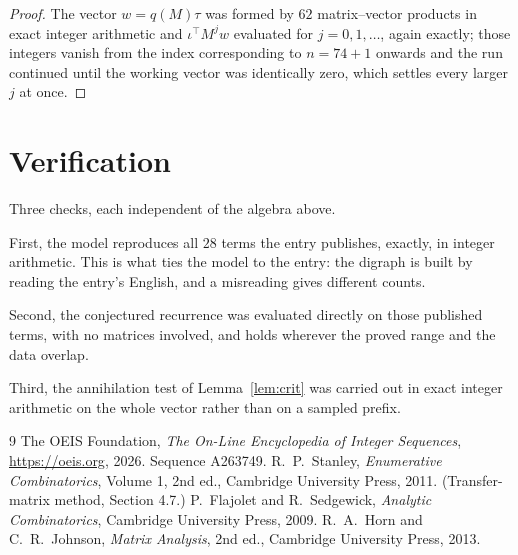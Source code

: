 \documentclass[11pt,a4paper]{article}
\theoremstyle{plain}
\theoremstyle{definition}
\begin{document}
\begin{proof}
The vector $w=q(M)\tau$ was formed by $62$ matrix--vector products in exact integer
arithmetic and $\iota^{\!\top}M^{j}w$ evaluated for $j=0,1,\dots$, again exactly; those
integers vanish from the index corresponding to $n=74+1$ onwards and the run continued
until the working vector was identically zero, which settles every larger $j$ at once.
\end{proof}

\section{Verification}

Three checks, each independent of the algebra above.

First, the model reproduces all $28$ terms the entry publishes, exactly, in integer
arithmetic. This is what ties the model to the entry: the digraph is built by reading the
entry's English, and a misreading gives different counts.

Second, the conjectured recurrence was evaluated directly on those published terms, with no
matrices involved, and holds wherever the proved range and the data overlap.

Third, the annihilation test of Lemma~\ref{lem:crit} was carried out in exact integer
arithmetic on the whole vector rather than on a sampled prefix.

\begin{thebibliography}{9}
 The OEIS Foundation, \emph{The On-Line Encyclopedia of Integer
Sequences}, \url{https://oeis.org}, 2026. Sequence A263749.
 R.~P.~Stanley, \emph{Enumerative Combinatorics}, Volume 1, 2nd ed.,
Cambridge University Press, 2011. (Transfer-matrix method, Section 4.7.)
 P.~Flajolet and R.~Sedgewick, \emph{Analytic Combinatorics}, Cambridge
University Press, 2009.
 R.~A.~Horn and C.~R.~Johnson, \emph{Matrix Analysis}, 2nd ed., Cambridge
University Press, 2013.
\end{thebibliography}
\end{document}
